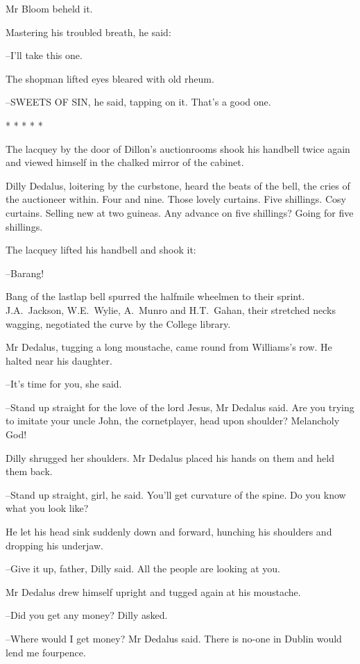 Mr Bloom beheld it.

Mastering his troubled breath,
he said:

--I'll take this one.

The shopman lifted eyes
bleared with old rheum.

--SWEETS OF SIN,
he said,
tapping on it.
That's a good one.


    * * * * *


The lacquey by the door of Dillon's auctionrooms
shook his handbell
twice again
and viewed himself in the chalked mirror of the cabinet.

Dilly Dedalus, loitering by the curbstone,
heard the beats of the bell,
the cries of the auctioneer within.
Four and nine.
Those lovely curtains.
Five shillings.
Cosy curtains.
Selling new at two guineas.
Any advance on
five shillings?
Going for five shillings.

The lacquey lifted his handbell and shook it:

--Barang!%

Bang of the lastlap bell
spurred the halfmile wheelmen to their sprint.
J.A.~Jackson,
W.E.~Wylie,
A.~Munro
and H.T.~Gahan,
their stretched
necks wagging,
negotiated the curve by the College library.

Mr Dedalus,
tugging a long moustache,
came round from Williams's
row.
He halted near his daughter.

--It's time for you,
she said.

--Stand up straight for the love of the lord Jesus,
Mr Dedalus said.
Are
you trying to imitate your uncle John, the cornetplayer,
head upon
shoulder?
Melancholy God!

Dilly shrugged her shoulders.
Mr Dedalus placed his hands on them
and held them back.

--Stand up straight, girl,
he said.
You'll get curvature of the spine.
Do you know what you look like?

He let his head sink suddenly down and forward,
hunching his
shoulders and dropping his underjaw.

--Give it up, father,
Dilly said.
All the people are looking at you.

Mr Dedalus drew himself upright
and tugged again at his moustache.

--Did you get any money?
Dilly asked.

--Where would I get money?
Mr Dedalus said.
There is no-one in Dublin would lend me fourpence.%


